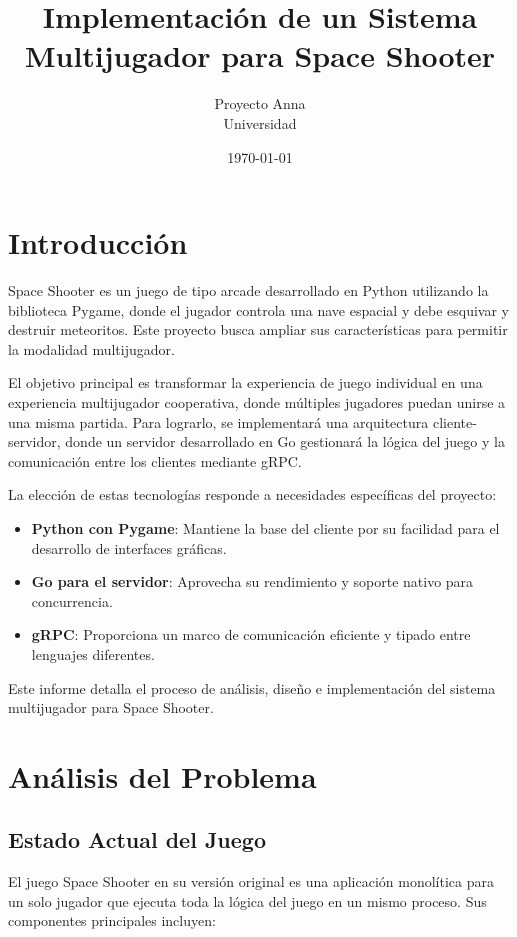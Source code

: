 \documentclass[11pt,letterpaper]{article}
\title{\textbf{Implementación de un Sistema Multijugador para Space Shooter}}
\author{Proyecto Anna \\ Universidad}
\date{\today}
\begin{document}
\maketitle

\tableofcontents
\newpage

\section{Introducción}

Space Shooter es un juego de tipo arcade desarrollado en Python utilizando la biblioteca Pygame, donde el jugador controla una nave espacial y debe esquivar y destruir meteoritos. Este proyecto busca ampliar sus características para permitir la modalidad multijugador.

El objetivo principal es transformar la experiencia de juego individual en una experiencia multijugador cooperativa, donde múltiples jugadores puedan unirse a una misma partida. Para lograrlo, se implementará una arquitectura cliente-servidor, donde un servidor desarrollado en Go gestionará la lógica del juego y la comunicación entre los clientes mediante gRPC.

La elección de estas tecnologías responde a necesidades específicas del proyecto:

\begin{itemize}
    \item \textbf{Python con Pygame}: Mantiene la base del cliente por su facilidad para el desarrollo de interfaces gráficas.
    \item \textbf{Go para el servidor}: Aprovecha su rendimiento y soporte nativo para concurrencia.
    \item \textbf{gRPC}: Proporciona un marco de comunicación eficiente y tipado entre lenguajes diferentes.
\end{itemize}

Este informe detalla el proceso de análisis, diseño e implementación del sistema multijugador para Space Shooter.

\section{Análisis del Problema}

\subsection{Estado Actual del Juego}

El juego Space Shooter en su versión original es una aplicación monolítica para un solo jugador que ejecuta toda la lógica del juego en un mismo proceso. Sus componentes principales incluyen:
\end{document}
